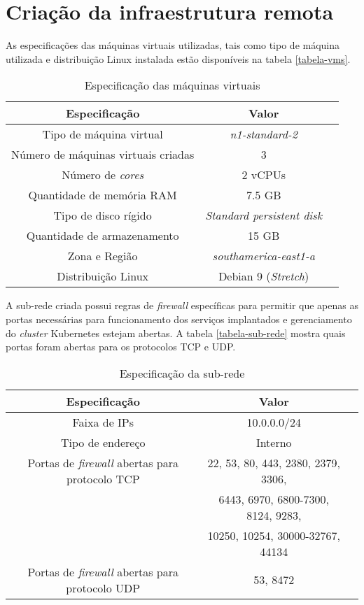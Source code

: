 \section{Criação da infraestrutura remota}

As especificações das máquinas virtuais utilizadas, tais como tipo de máquina utilizada e distribuição Linux instalada estão disponíveis na tabela \autoref{tabela-vms}.
\newline

\begin{table}[htb]
\centering
\caption{Especificação das máquinas virtuais}%
\label{tabela-vms}
\begin{tabular}{ccc}
\toprule
  Especificação & Valor \\
\midrule \midrule
  Tipo de máquina virtual & \textit{n1-standard-2} \\
\midrule
  Número de máquinas virtuais criadas & 3 \\
\midrule 
  Número de \textit{cores} & 2 \ac{vCPUs} \\
\midrule 
  Quantidade de memória RAM & 7.5 GB \\
\midrule
  Tipo de disco rígido & \textit{Standard persistent disk} \\
\midrule
  Quantidade de armazenamento & 15 GB \\
\midrule
  Zona e Região & \textit{southamerica-east1-a} \\
\midrule
  Distribuição Linux & Debian 9 (\textit{Stretch}) \\
\bottomrule
\end{tabular}%
{%
}
\end{table}

A sub-rede criada possui regras de \textit{firewall} específicas para permitir que apenas as portas necessárias para funcionamento dos serviços implantados e gerenciamento do \textit{cluster} Kubernetes estejam abertas. A tabela \autoref{tabela-sub-rede} mostra quais portas foram abertas para os protocolos \ac{TCP} e \ac{UDP}.

\begin{table}[htb]
\centering
\caption{Especificação da sub-rede}%
\label{tabela-sub-rede}
\begin{tabular}{ccc}
\toprule
  Especificação & Valor \\
\midrule \midrule
  Faixa de \ac{IP}s & 10.0.0.0/24 \\
\midrule 
  Tipo de endereço & Interno \\
\midrule 
  Portas de \textit{firewall} abertas para protocolo \ac{TCP} & 22, 53, 80, 443, 2380, 2379, 3306, \\
  & 6443, 6970, 6800-7300, 8124, 9283, \\
  & 10250, 10254, 30000-32767, 44134 \\
\midrule
  Portas de \textit{firewall} abertas para protocolo \ac{UDP} & 53, 8472 \\
\bottomrule
\end{tabular}%
{%
}
\end{table}

